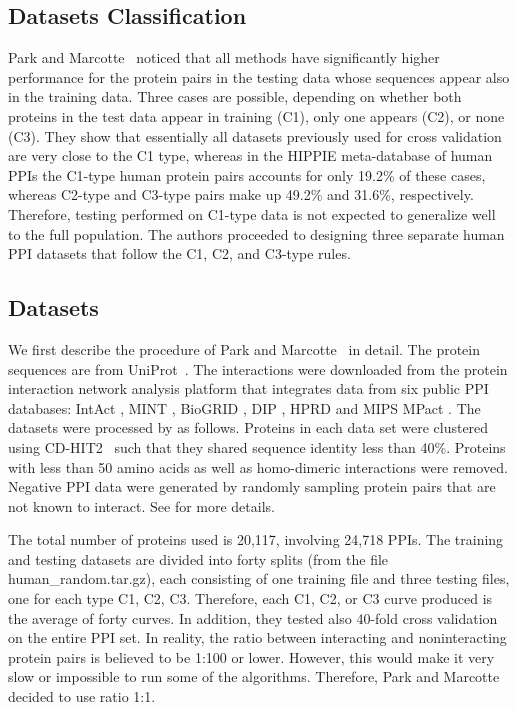 \subsection{Datasets Classification}
Park and Marcotte~\cite{ParkMarcotte12_C123} noticed that all methods have significantly higher performance for the protein pairs in the testing data whose sequences appear also in the training data. Three cases are possible, depending on whether both proteins in the test data appear in training (C1), only one appears (C2), or none (C3). They show that essentially all datasets previously used for cross validation are very close to the C1 type, whereas in the HIPPIE meta-database of human PPIs \cite{Schaefer12_HIPPIE} the C1-type human protein pairs accounts for only 19.2\% of these cases, whereas C2-type and C3-type pairs make up 49.2\% and 31.6\%, respectively. Therefore, testing performed on C1-type data is not expected to generalize well to the full population. The authors proceeded to designing three separate human PPI datasets that follow the C1, C2, and C3-type rules. 

\subsection{Datasets}
We first describe the procedure of Park and Marcotte~\cite{ParkMarcotte12_C123} in detail. The protein sequences are from UniProt~\cite{uniprot2012reorganizing}. The interactions were downloaded from the protein interaction network analysis platform \cite{Wu09_PINA} that integrates data from six public PPI databases: IntAct \cite{Kerrien07_IntAct}, MINT \cite{Chatr07_MINT}, BioGRID \cite{Stark11_BioGRID}, DIP \cite{Salwinski04_DIP}, HPRD \cite{Prasad09_HPRD} and MIPS MPact \cite{Guldener06_MIPS_MPact}. The datasets were processed by \cite{ParkMarcotte12_C123} as follows. Proteins in each data set were clustered using CD-HIT2~\cite{li2006cd} such that they shared sequence identity less than 40\%. Proteins with less than 50 amino acids as well as homo-dimeric interactions were removed. Negative PPI data were generated by randomly sampling protein pairs that are not known to interact. See \cite{ParkMarcotte12_C123} for more details.

The total number of proteins used is 20,117, involving 24,718 PPIs. The training and testing datasets are divided into forty splits (from the file human\_random.tar.gz), each consisting of one training file and three testing files, one for each type C1, C2, C3.  Therefore, each C1, C2, or C3 curve produced is the average of forty curves. In addition, they tested also 40-fold cross validation on the entire PPI set. In reality, the ratio between interacting and noninteracting protein pairs is believed to be 1:100 or lower. However, this would make it very slow or impossible to run some of the algorithms. Therefore, Park and Marcotte decided to use ratio 1:1.

